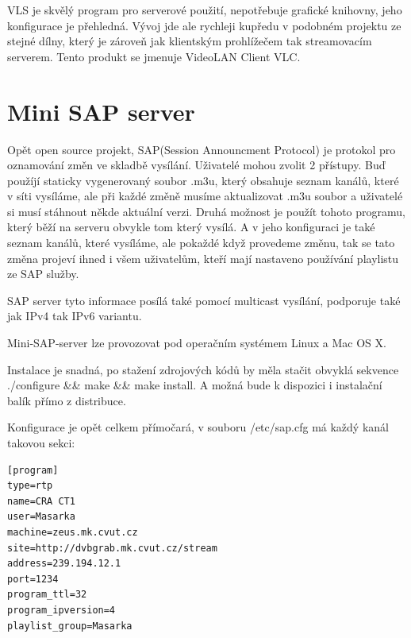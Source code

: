 \vspace{10pt}

VLS je skvělý program pro serverové použití, nepotřebuje grafické knihovny, jeho konfigurace je přehledná. Vývoj jde ale rychleji kupředu v podobném projektu ze stejné dílny, který je zároveň jak klientským prohlížečem tak streamovacím serverem. Tento produkt se jmenuje VideoLAN Client VLC.

\vspace{10pt}

\section{Mini SAP server}

Opět open source projekt, SAP(Session Announcment Protocol) je protokol pro oznamování změn ve skladbě vysílání. Uživatelé mohou zvolit 2 přístupy. Buď použíjí staticky vygenerovaný soubor .m3u, který obsahuje seznam kanálů, které v síti vysíláme, ale při každé změně musíme aktualizovat .m3u soubor a uživatelé si musí stáhnout někde aktuální verzi. Druhá možnost je použít tohoto programu, který běží na serveru obvykle tom který vysílá. A v jeho konfiguraci je také seznam kanálů, které vysíláme, ale pokaždé když provedeme změnu, tak se tato změna projeví ihned i všem uživatelům, kteří mají nastaveno používání playlistu ze SAP služby.

\vspace{10pt}

SAP server tyto informace posílá také pomocí multicast vysílání, podporuje také jak IPv4 tak IPv6 variantu.

\vspace{10pt}

Mini-SAP-server lze provozovat pod operačním systémem Linux a Mac OS X. 

\vspace{10pt}

Instalace je snadná, po stažení zdrojových kódů by měla stačit obvyklá sekvence ./configure \&\& make \&\& make install. A možná bude k dispozici i instalační balík přímo z distribuce.

\vspace{10pt}

Konfigurace je opět celkem přímočará, v souboru /etc/sap.cfg má každý kanál takovou sekci: 

\vspace{10pt}

\begin{small}
\begin{verbatim}
[program]
type=rtp
name=CRA CT1
user=Masarka
machine=zeus.mk.cvut.cz
site=http://dvbgrab.mk.cvut.cz/stream
address=239.194.12.1
port=1234
program_ttl=32
program_ipversion=4
playlist_group=Masarka
\end{verbatim}
\end{small}


